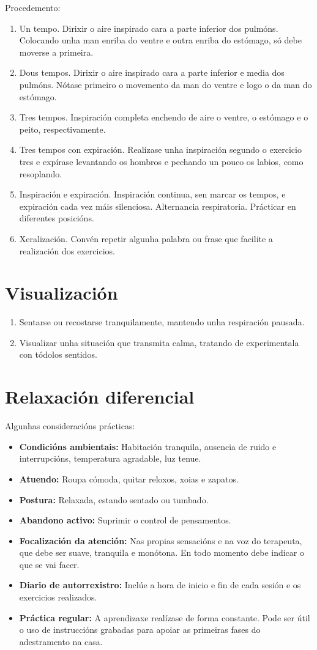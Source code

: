 \documentclass[a4paper,11pt]{article}
\begin{document}
Procedemento:
\begin{enumerate}
	\item Un tempo. Dirixir o aire inspirado cara a parte inferior dos pulmóns. Colocando unha man 
	enriba do ventre e outra enriba do estómago, só debe moverse a primeira.
	\item Dous tempos. Dirixir o aire inspirado cara a parte inferior e media dos pulmóns. Nótase 
	primeiro o movemento da man do ventre e logo o da man do estómago.
	\item Tres tempos. Inspiración completa enchendo de aire o ventre, o estómago e o peito, 
	respectivamente.
	\item Tres tempos con expiración. Realízase unha inspiración segundo o exercicio tres e expírase 
	levantando os hombros e pechando un pouco os labios, como resoplando.
	\item Inspiración e expiración. Inspiración continua, sen marcar os tempos, e expiración cada vez 
	máis silenciosa. Alternancia respiratoria. Prácticar en diferentes posicións.
	\item Xeralización. Convén repetir algunha palabra ou frase que facilite a realización dos 
	exercicios. 
\end{enumerate}

\section{Visualización}
\begin{enumerate}
	\item Sentarse ou recostarse tranquilamente, mantendo unha respiración pausada.
	\item Visualizar unha situación que transmita calma, tratando de experimentala con tódolos 
	sentidos. 
\end{enumerate}

\section{Relaxación diferencial}
Algunhas consideracións prácticas:
\begin{itemize}
	\item \textbf{Condicións ambientais:} Habitación tranquila, ausencia de ruido e interrupcións, 
	temperatura agradable, luz tenue.
	\item \textbf{Atuendo:} Roupa cómoda, quitar reloxos, xoias e zapatos.
	\item \textbf{Postura:} Relaxada, estando sentado ou tumbado. 
	\item \textbf{Abandono activo:} Suprimir o control de pensamentos.
	\item \textbf{Focalización da atención:} Nas propias sensacións e na voz do terapeuta, que debe 
	ser suave, tranquila e monótona. En todo momento debe indicar o que se vai facer.
	\item \textbf{Diario de autorrexistro:} Inclúe a hora de inicio e fin de cada sesión e os 
	exercicios realizados. 
	\item \textbf{Práctica regular:} A aprendizaxe realízase de forma constante. Pode ser útil o uso 
	de instruccións grabadas para apoiar as primeiras fases do adestramento na casa.
\end{itemize}
\end{document}
